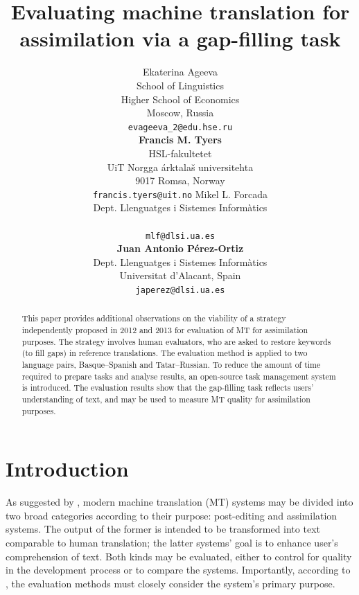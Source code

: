 \documentclass[11pt]{article}
\title{Evaluating machine translation for assimilation via a gap-filling task}
\author{{Ekaterina Ageeva}\\
  {School of Linguistics}\\
  {Higher School of Economics}\\
  {Moscow, Russia}\\
  {{\tt evageeva\_2@edu.hse.ru}}\\[2ex]
  {\textbf{Francis M. Tyers}}\\
  {HSL-fakultetet}\\ 
  {UiT Norgga \'{a}rktala\v{s} universitehta} \\
  {9017 Romsa, Norway} \\
  {{\tt francis.tyers@uit.no}}
  \And
  {Mikel L. Forcada}\\
  {Dept. Llenguatges i Sistemes Inform\`{a}tics}\\
  \blankout{Universitat d'Alacant, Spain} \\
  {{\tt mlf@dlsi.ua.es}}  \\[2ex]
  {\textbf{Juan Antonio P\'{e}rez-Ortiz}} \\
  {Dept. Llenguatges i Sistemes Inform\`{a}tics}\\
  {Universitat d'Alacant, Spain} \\
  {{\tt japerez@dlsi.ua.es}}
}
\date{}
\begin{document}
\maketitle
\renewcommand{\baselinestretch}{0.97} %
\begin{abstract}
  This paper provides additional observations on the viability of a
  strategy independently proposed in 2012 and 2013 for evaluation of
 MT for assimilation purposes. The strategy involves
  human evaluators, who are asked to restore keywords (to fill gaps) in
  reference translations. The evaluation method is applied to two language pairs, Basque--Spanish and Tatar--Russian. To reduce the amount of time required to prepare tasks
  and analyse results, an open-source task management system is
  introduced. The evaluation results show that the gap-filling task
  reflects users' understanding of text, and may be used to measure MT
  quality for assimilation purposes.
\end{abstract}

\section{Introduction}

As suggested by \citet{church93}, modern machine translation (MT) systems may
be divided into two broad categories according to their purpose: post-editing and assimilation systems. The output of the former is intended to be transformed into text comparable to human translation; the latter systems' goal is to enhance user's comprehension of text. Both kinds may be evaluated, either to control for quality in the development process or to compare the systems. Importantly, according to \citet{church93}, the evaluation methods must closely consider the system's primary purpose.
\end{document}
